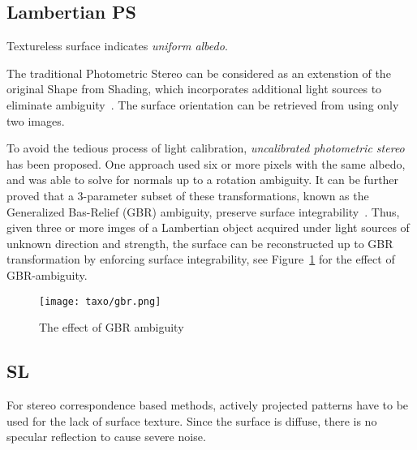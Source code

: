 \subsection{Lambertian PS}
Textureless surface indicates \textit{uniform albedo}.

The traditional Photometric Stereo can be considered as an extenstion of the original Shape from Shading, which incorporates additional light sources to eliminate ambiguity~\cite{woodham1980photometric}. The surface orientation can be retrieved from using only two images.

To avoid the tedious process of light calibration, \textit{uncalibrated photometric stereo} has been proposed. One approach used six or more pixels with the same albedo, and was able to solve for normals up to a rotation ambiguity\cite{hayakawa1994photometric}. It can be further proved that a 3-parameter subset of these transformations, known as the Generalized Bas-Relief (GBR) ambiguity, preserve surface integrability~\cite{belhumeur1999bas}. Thus, given three or more imges of a Lambertian object acquired under light sources of unknown direction and strength, the surface can be reconstructed up to GBR transformation by enforcing surface integrability, see Figure~\ref{fig:gbr} for the effect of GBR-ambiguity.
\begin{figure}[!htbp]
\centering
\texttt{[image: taxo/gbr.png]}
\caption{The effect of GBR ambiguity}
\label{fig:gbr}
\end{figure}

\subsection{SL}
For stereo correspondence based methods, actively projected patterns have to be used for the lack of surface texture. Since the surface is diffuse, there is no specular reflection to cause severe noise.

